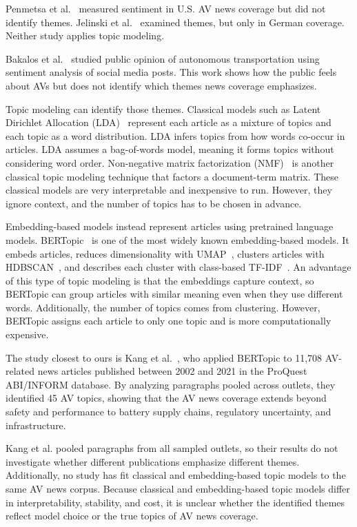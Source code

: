 \documentclass[conference]{IEEEtran}
\begin{document}
Penmetsa et al.~\cite{penmetsa2023news} measured sentiment in U.S. AV news coverage but did not identify themes. Jelinski et al.~\cite{jelinski2021undifferentiated} examined themes, but only in German coverage. Neither study applies topic modeling.

Bakalos et al.~\cite{bakalos2020} studied public opinion of autonomous transportation using sentiment analysis of social media posts. This work shows how the public feels about AVs but does not identify which themes news coverage emphasizes.

Topic modeling can identify those themes. Classical models such as Latent Dirichlet Allocation (LDA)~\cite{blei2003lda} represent each article as a mixture of topics and each topic as a word distribution. LDA infers topics from how words co-occur in articles. LDA assumes a bag-of-words model, meaning it forms topics without considering word order. Non-negative matrix factorization (NMF)~\cite{lee1999nmf} is another classical topic modeling technique that factors a document-term matrix. These classical models are very interpretable and inexpensive to run. However, they ignore context, and the number of topics has to be chosen in advance. 

Embedding-based models instead represent articles using pretrained language models. BERTopic~\cite{grootendorst2022bertopic} is one of the most widely known embedding-based models. It embeds articles, reduces dimensionality with UMAP~\cite{mcinnes2018umap}, clusters articles with HDBSCAN~\cite{campello2013hdbscan}, and describes each cluster with class-based TF-IDF~\cite{alammar2024}. An advantage of this type of topic modeling is that the embeddings capture context, so BERTopic can group articles with similar meaning even when they use different words. Additionally, the number of topics comes from clustering. However, BERTopic assigns each article to only one topic and is more computationally expensive. 

The study closest to ours is Kang et al.~\cite{kang2025unveiling}, who applied BERTopic to 11,708 AV-related news articles published between 2002 and 2021 in the ProQuest ABI/INFORM database. By analyzing paragraphs pooled across outlets, they identified 45 AV topics, showing that the AV news coverage extends beyond safety and performance to battery supply chains, regulatory uncertainty, and infrastructure. 

Kang et al. pooled paragraphs from all sampled outlets, so their results do not investigate whether different publications emphasize different themes. Additionally, no study has fit classical and embedding-based topic models to the same AV news corpus. Because classical and embedding-based topic models differ in interpretability, stability, and cost, it is unclear whether the identified themes reflect model choice or the true topics of AV news coverage. 
\end{document}
